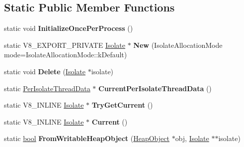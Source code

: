 \subsection*{Static Public Member Functions}
\begin{DoxyCompactItemize}
\item 
\mbox{\label{classv8_1_1internal_1_1Isolate_a04b11e5e7cb6d5a5c85e53cae6915221}} 
static void {\bfseries Initialize\+Once\+Per\+Process} ()
\item 
\mbox{\label{classv8_1_1internal_1_1Isolate_a8744617e6ce9830be9b7ae5c197f0d59}} 
static V8\+\_\+\+E\+X\+P\+O\+R\+T\+\_\+\+P\+R\+I\+V\+A\+TE \mbox{\hyperlink{classv8_1_1internal_1_1Isolate}{Isolate}} $\ast$ {\bfseries New} (Isolate\+Allocation\+Mode mode=Isolate\+Allocation\+Mode\+::k\+Default)
\item 
\mbox{\label{classv8_1_1internal_1_1Isolate_a812b9ea4fd4762413aadb32799e75590}} 
static void {\bfseries Delete} (\mbox{\hyperlink{classv8_1_1internal_1_1Isolate}{Isolate}} $\ast$isolate)
\item 
\mbox{\label{classv8_1_1internal_1_1Isolate_a826750b3afeec400dcbc3091f7cbef84}} 
static \mbox{\hyperlink{classv8_1_1internal_1_1Isolate_1_1PerIsolateThreadData}{Per\+Isolate\+Thread\+Data}} $\ast$ {\bfseries Current\+Per\+Isolate\+Thread\+Data} ()
\item 
\mbox{\label{classv8_1_1internal_1_1Isolate_a774c1e04201a10cb12aceead74c0f481}} 
static V8\+\_\+\+I\+N\+L\+I\+NE \mbox{\hyperlink{classv8_1_1internal_1_1Isolate}{Isolate}} $\ast$ {\bfseries Try\+Get\+Current} ()
\item 
\mbox{\label{classv8_1_1internal_1_1Isolate_a82500f2334775422ca68be5ea0980e96}} 
static V8\+\_\+\+I\+N\+L\+I\+NE \mbox{\hyperlink{classv8_1_1internal_1_1Isolate}{Isolate}} $\ast$ {\bfseries Current} ()
\item 
\mbox{\label{classv8_1_1internal_1_1Isolate_a4b84da92fd05792619c750f5d47f35c7}} 
static \mbox{\hyperlink{classbool}{bool}} {\bfseries From\+Writable\+Heap\+Object} (\mbox{\hyperlink{classv8_1_1internal_1_1HeapObject}{Heap\+Object}} $\ast$obj, \mbox{\hyperlink{classv8_1_1internal_1_1Isolate}{Isolate}} $\ast$$\ast$isolate)
$$
\end{DoxyCompactItemize}

